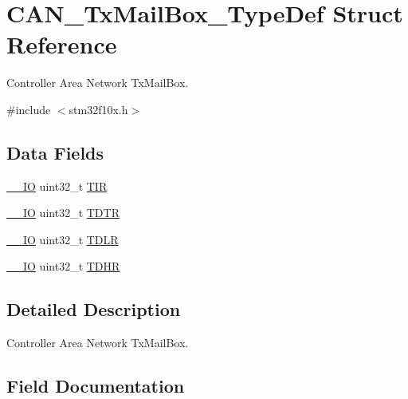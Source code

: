 \hypertarget{struct_c_a_n___tx_mail_box___type_def}{}\section{C\+A\+N\+\_\+\+Tx\+Mail\+Box\+\_\+\+Type\+Def Struct Reference}
\label{struct_c_a_n___tx_mail_box___type_def}


Controller Area Network Tx\+Mail\+Box.  




{\ttfamily \#include $<$stm32f10x.\+h$>$}

\subsection*{Data Fields}
\begin{DoxyCompactItemize}
\item 
\mbox{\hyperlink{core__sc300_8h_aec43007d9998a0a0e01faede4133d6be}{\+\_\+\+\_\+\+IO}} uint32\+\_\+t \mbox{\hyperlink{struct_c_a_n___tx_mail_box___type_def_a6921aa1c578a7d17c6e0eb33a73b6630}{T\+IR}}
\item 
\mbox{\hyperlink{core__sc300_8h_aec43007d9998a0a0e01faede4133d6be}{\+\_\+\+\_\+\+IO}} uint32\+\_\+t \mbox{\hyperlink{struct_c_a_n___tx_mail_box___type_def_aed87bed042dd9523ce086119a3bab0ea}{T\+D\+TR}}
\item 
\mbox{\hyperlink{core__sc300_8h_aec43007d9998a0a0e01faede4133d6be}{\+\_\+\+\_\+\+IO}} uint32\+\_\+t \mbox{\hyperlink{struct_c_a_n___tx_mail_box___type_def_aded1359e1a32512910bff534d57ade68}{T\+D\+LR}}
\item 
\mbox{\hyperlink{core__sc300_8h_aec43007d9998a0a0e01faede4133d6be}{\+\_\+\+\_\+\+IO}} uint32\+\_\+t \mbox{\hyperlink{struct_c_a_n___tx_mail_box___type_def_a90f7c1cf22683459c632d6040366eddf}{T\+D\+HR}}
\end{DoxyCompactItemize}


\subsection{Detailed Description}
Controller Area Network Tx\+Mail\+Box. 

\subsection{Field Documentation}
\mbox{\label{struct_c_a_n___tx_mail_box___type_def_a90f7c1cf22683459c632d6040366eddf}} 
